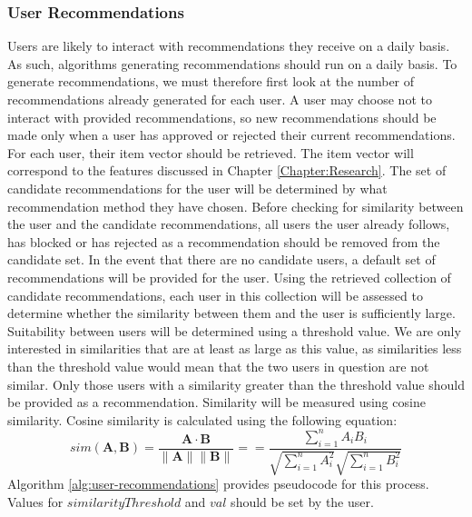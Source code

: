 \subsubsection{User Recommendations}
\label{sec:user-recommendations}
Users are likely to interact with recommendations they receive on a daily basis. As such, algorithms generating recommendations should run on a daily basis. To generate recommendations, we must therefore first look at the number of recommendations already generated for each user. A user may choose not to interact with provided recommendations, so new recommendations should be made only when a user has approved or rejected their current recommendations. For each user, their item vector should be retrieved. The item vector will correspond to the features discussed in Chapter \ref{Chapter:Research}. The set of candidate recommendations for the user will be determined by what recommendation method they have chosen. Before checking for similarity between the user and the candidate recommendations, all users the user already follows, has blocked or has rejected as a recommendation should be removed from the candidate set. In the event that there are no candidate users, a default set of recommendations will be provided for the user. Using the retrieved collection of candidate recommendations, each user in this collection will be assessed to determine whether the similarity between them and the user is sufficiently large. Suitability between users will be determined using a threshold value. We are only interested in similarities that are at least as large as this value, as similarities less than the threshold value would mean that the two users in question are not similar. Only those users with a similarity greater than the threshold value should be provided as a recommendation. Similarity will be measured using cosine similarity. Cosine similarity is calculated using the following equation:
\begin{equation}
sim(\mathbf{A},\mathbf{B}) = \frac{\mathbf{A} \cdot \mathbf{B}}{\parallel\mathbf{A}\parallel \parallel\mathbf{B}\parallel} = = \frac{ \sum\limits_{i=1}^{n}{A_i  B_i} }{ \sqrt{\sum\limits_{i=1}^{n}{A_i^2}}  \sqrt{\sum\limits_{i=1}^{n}{B_i^2}} }
\label{eq:cos-similarity}
\end{equation}
Algorithm \ref{alg:user-recommendations} provides pseudocode for this process. Values for $similarityThreshold$ and $val$ should be set by the user.

